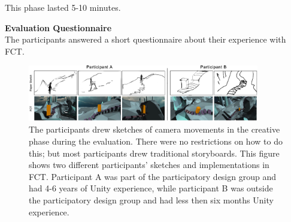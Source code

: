 This phase lasted 5-10 minutes.

\textbf{Evaluation Questionnaire}\\
The participants answered a short questionnaire about their experience with FCT.

\begin{figure}[htbp]
\centering
\includegraphics[width=0.9\textwidth]{Pics/Sketching_FramingsNew}
\caption{The participants drew sketches of camera movements in the creative phase during the evaluation. There were no restrictions on how to do this; but most participants drew traditional storyboards. This figure shows two different participants' sketches and implementations in FCT. Participant A was part of the participatory design group and had 4-6 years of Unity experience, while participant B was outside the participatory design group and had less then six months Unity experience.}
\label{fig:Sketching_Framings}
\end{figure}